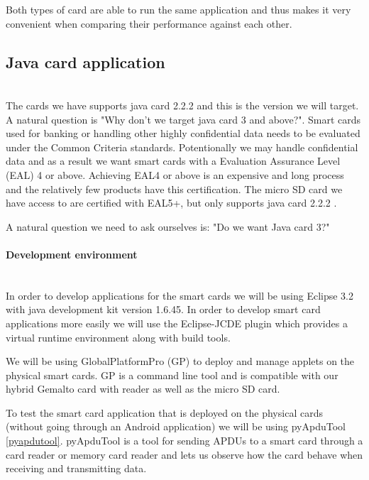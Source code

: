 Both types of card are able to run the same application and thus makes it very convenient when comparing their performance against each other.

\iffalse %

\subsection{Java card application}\mbox{}\\
The cards we have supports java card 2.2.2 and this is the version we will target. A natural question is "Why don't we target java card 3 and above?". Smart cards used for banking or handling other highly confidential data needs to be evaluated under the Common Criteria \cite{commoncriteria} standards. Potentionally we may handle confidential data and as a result we want smart cards with a Evaluation Assurance Level (EAL) 4 or above. Achieving EAL4 or above is an expensive and long process and the relatively few products have this certification. The micro SD card we have access to are certified with EAL5+, but only supports java card 2.2.2 \cite{gemaltoidgo8030}.


A natural question we need to ask ourselves is: "Do we want Java card 3?"



\paragraph{Development environment}\mbox{}\\
In order to develop applications for the smart cards we will be using Eclipse 3.2 with java development kit version 1.6.45. In order to develop smart card applications more easily we will use the Eclipse-JCDE plugin \cite{eclipseJCDE} which provides a virtual runtime environment along with build tools.

We will be using GlobalPlatformPro (GP) \cite{globalplatform} to deploy and manage applets on the physical smart cards. GP is a command line tool and is compatible with our hybrid Gemalto card with reader as well as the micro SD card.

To test the smart card application that is deployed on the physical cards (without going through an Android application) we will be using pyApduTool \ref{pyapdutool}. pyApduTool is a tool for sending APDUs to a smart card through a card reader or memory card reader and lets us observe how the card behave when receiving and transmitting data.

